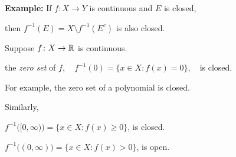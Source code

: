 \documentclass[10pt,aspectratio=169]{beamer}
\begin{document}
\begin{frame}

\textbf{Example:}
If $f \colon X \to Y$ is continuous and $E$ is closed,

\pause
then $f^{-1}(E) = X \setminus f^{-1}(E^c)$ is also closed.

\pause
\medskip

Suppose 
$f \colon X \to {\mathbb{R}}$ is continuous.

\pause
\medskip

\thus \quad
the 
\emph{zero set} of $f$, ~
$f^{-1}(0) = \bigl\{ x \in X : f(x) = 0 \bigr\}$, ~
is closed.

\pause
\medskip

For example, the zero set of a polynomial is closed.

\pause
\medskip

Similarly, 

\medskip

$f^{-1}\bigl( [0,\infty) \bigr) = \bigl\{ x \in X : f(x) \geq 0 \bigr\}$,
is closed.

\pause
\medskip

$f^{-1}\bigl( (0,\infty) \bigr) = \bigl\{ x \in X : f(x) > 0 \bigr\}$,
is open.  

\end{frame}
\end{document}
